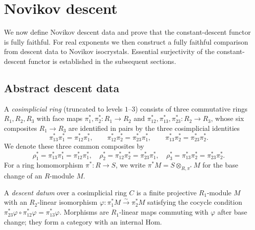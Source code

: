 \section{Novikov descent}
\label{sec:novikov_descent}

We now define Novikov descent data and prove that the constant-descent functor
is fully faithful.  For real exponents we then construct a fully faithful
comparison from descent data to Novikov isocrystals.  Essential surjectivity of
the constant-descent functor is established in the subsequent sections.

\subsection{Abstract descent data}

\begin{definition}
  \label{def:cosimplicial_ring}
  \leanok
  A \emph{cosimplicial ring} (truncated to levels $1$--$3$) consists of
  three commutative rings $R_1, R_2, R_3$ with face maps
  $\pi_1^\ast, \pi_2^\ast \colon R_1 \to R_2$ and
  $\pi_{12}^\ast, \pi_{13}^\ast, \pi_{23}^\ast \colon R_2 \to R_3$,
  whose six composites $R_1\to R_3$ are identified in pairs by the three
  cosimplicial identities
  \[
    \pi_{13}^\ast\pi_1^\ast=\pi_{12}^\ast\pi_1^\ast,\qquad
    \pi_{12}^\ast\pi_2^\ast=\pi_{23}^\ast\pi_1^\ast,\qquad
    \pi_{13}^\ast\pi_2^\ast=\pi_{23}^\ast\pi_2^\ast.
  \]
  We denote these three common composites by
  \[
    \rho_1^\ast=\pi_{13}^\ast\pi_1^\ast=\pi_{12}^\ast\pi_1^\ast,
    \quad
    \rho_2^\ast=\pi_{12}^\ast\pi_2^\ast=\pi_{23}^\ast\pi_1^\ast,
    \quad
    \rho_3^\ast=\pi_{13}^\ast\pi_2^\ast=\pi_{23}^\ast\pi_2^\ast.
  \]
  For a ring homomorphism $\pi^\ast \colon R \to S$, we write
  $\pi^\ast M = S \otimes_{R, \pi^\ast} M$ for the base change of an $R$-module $M$.
\end{definition}

\begin{definition}
  \label{def:descent_datum}
  \leanok
  A \emph{descent datum} over a cosimplicial ring $C$ is a finite projective
  $R_1$-module $M$ with an $R_2$-linear isomorphism
  $\varphi \colon \pi_1^\ast M \xrightarrow{\sim} \pi_2^\ast M$ satisfying the
  cocycle condition
  $\pi_{23}^\ast\varphi \circ \pi_{12}^\ast\varphi = \pi_{13}^\ast\varphi$.
  Morphisms are $R_1$-linear maps commuting with $\varphi$ after base change;
  they form a category with an internal Hom.
\end{definition}


